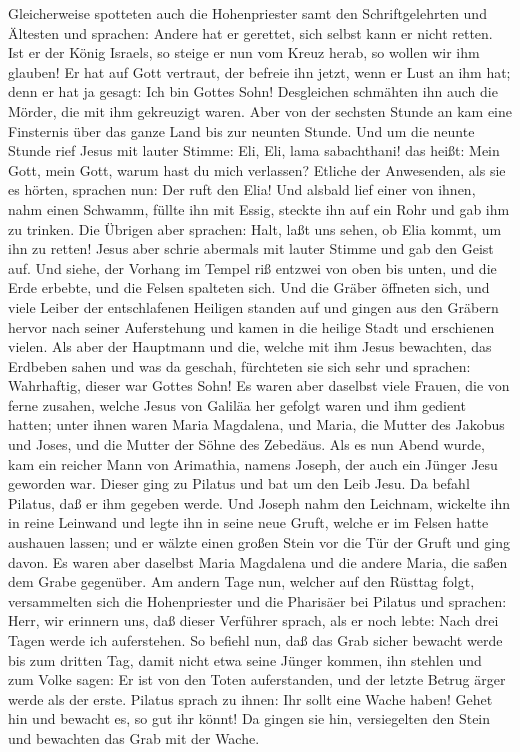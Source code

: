 Gleicherweise spotteten auch die Hohenpriester samt den
Schriftgelehrten und Ältesten und sprachen:  Andere hat
er gerettet, sich selbst kann er nicht retten. Ist er der König Israels,
so steige er nun vom Kreuz herab, so wollen wir ihm glauben!
 Er hat auf Gott vertraut, der befreie ihn jetzt, wenn er
Lust an ihm hat; denn er hat ja gesagt: Ich bin Gottes Sohn!
 Desgleichen schmähten ihn auch die Mörder, die mit ihm
gekreuzigt waren.  Aber von der sechsten Stunde an kam
eine Finsternis über das ganze Land bis zur neunten Stunde.
 Und um die neunte Stunde rief Jesus mit lauter Stimme:
Eli, Eli, lama sabachthani! das heißt: Mein Gott, mein Gott, warum hast
du mich verlassen?  Etliche der Anwesenden, als sie es
hörten, sprachen nun: Der ruft den Elia!  Und alsbald
lief einer von ihnen, nahm einen Schwamm, füllte ihn mit Essig, steckte
ihn auf ein Rohr und gab ihm zu trinken.  Die Übrigen
aber sprachen: Halt, laßt uns sehen, ob Elia kommt, um ihn zu retten!
 Jesus aber schrie abermals mit lauter Stimme und gab den
Geist auf.  Und siehe, der Vorhang im Tempel riß entzwei
von oben bis unten, und die Erde erbebte, und die Felsen spalteten sich.
 Und die Gräber öffneten sich, und viele Leiber der
entschlafenen Heiligen standen auf  und gingen aus den
Gräbern hervor nach seiner Auferstehung und kamen in die heilige Stadt
und erschienen vielen.  Als aber der Hauptmann und die,
welche mit ihm Jesus bewachten, das Erdbeben sahen und was da geschah,
fürchteten sie sich sehr und sprachen: Wahrhaftig, dieser war Gottes
Sohn!  Es waren aber daselbst viele Frauen, die von ferne
zusahen, welche Jesus von Galiläa her gefolgt waren und ihm gedient
hatten;  unter ihnen waren Maria Magdalena, und Maria,
die Mutter des Jakobus und Joses, und die Mutter der Söhne des Zebedäus.
 Als es nun Abend wurde, kam ein reicher Mann von
Arimathia, namens Joseph, der auch ein Jünger Jesu geworden war.
 Dieser ging zu Pilatus und bat um den Leib Jesu. Da
befahl Pilatus, daß er ihm gegeben werde.  Und Joseph
nahm den Leichnam, wickelte ihn in reine Leinwand  und
legte ihn in seine neue Gruft, welche er im Felsen hatte aushauen
lassen; und er wälzte einen großen Stein vor die Tür der Gruft und ging
davon.  Es waren aber daselbst Maria Magdalena und die
andere Maria, die saßen dem Grabe gegenüber.  Am andern
Tage nun, welcher auf den Rüsttag folgt, versammelten sich die
Hohenpriester und die Pharisäer bei Pilatus  und
sprachen: Herr, wir erinnern uns, daß dieser Verführer sprach, als er
noch lebte: Nach drei Tagen werde ich auferstehen.  So
befiehl nun, daß das Grab sicher bewacht werde bis zum dritten Tag,
damit nicht etwa seine Jünger kommen, ihn stehlen und zum Volke sagen:
Er ist von den Toten auferstanden, und der letzte Betrug ärger werde als
der erste.  Pilatus sprach zu ihnen: Ihr sollt eine Wache
haben! Gehet hin und bewacht es, so gut ihr könnt!  Da
gingen sie hin, versiegelten den Stein und bewachten das Grab mit der
Wache.


